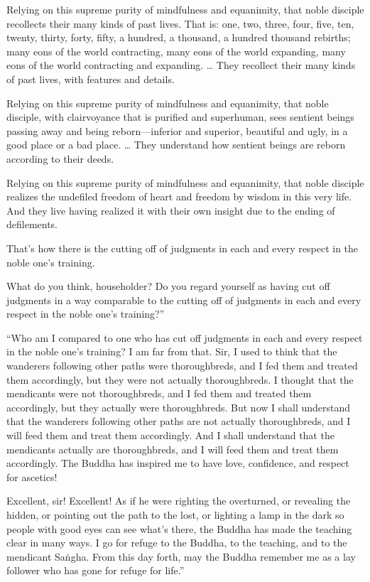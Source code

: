 \documentclass[12pt,openany]{book}%
\begin{document}
Relying on this supreme purity of mindfulness and equanimity, that noble disciple recollects their many kinds of past lives. That is: one, two, three, four, five, ten, twenty, thirty, forty, fifty, a hundred, a thousand, a hundred thousand rebirths; many eons of the world contracting, many eons of the world expanding, many eons of the world contracting and expanding. … They recollect their many kinds of past lives, with features and details. 

Relying on this supreme purity of mindfulness and equanimity, that noble disciple, with clairvoyance that is purified and superhuman, sees sentient beings passing away and being reborn—inferior and superior, beautiful and ugly, in a good place or a bad place. … They understand how sentient beings are reborn according to their deeds. 

Relying on this supreme purity of mindfulness and equanimity, that noble disciple realizes the undefiled freedom of heart and freedom by wisdom in this very life. And they live having realized it with their own insight due to the ending of defilements. 

That’s how there is the cutting off of judgments in each and every respect in the noble one’s training. 

What do you think, householder? Do you regard yourself as having cut off judgments in a way comparable to the cutting off of judgments in each and every respect in the noble one’s training?” 

“Who am I compared to one who has cut off judgments in each and every respect in the noble one’s training? I am far from that. Sir, I used to think that the wanderers following other paths were thoroughbreds, and I fed them and treated them accordingly, but they were not actually thoroughbreds. I thought that the mendicants were not thoroughbreds, and I fed them and treated them accordingly, but they actually were thoroughbreds. But now I shall understand that the wanderers following other paths are not actually thoroughbreds, and I will feed them and treat them accordingly. And I shall understand that the mendicants actually are thoroughbreds, and I will feed them and treat them accordingly. The Buddha has inspired me to have love, confidence, and respect for ascetics! 

Excellent, sir! Excellent! As if he were righting the overturned, or revealing the hidden, or pointing out the path to the lost, or lighting a lamp in the dark so people with good eyes can see what’s there, the Buddha has made the teaching clear in many ways. I go for refuge to the Buddha, to the teaching, and to the mendicant \textsanskrit{Saṅgha}. From this day forth, may the Buddha remember me as a lay follower who has gone for refuge for life.” 
\end{document}
